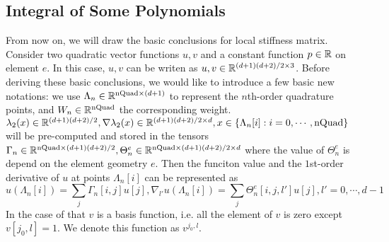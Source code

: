 \subsection{Integral of Some Polynomials}
From now on, we will draw the basic conclusions for local stiffness matrix. 
Consider two quadratic vector functions $u,v$ and a constant function $p\in\mathbb{R}$ on element $e$.
In this case, $u,v$ can be writen as $u,v\in\mathbb{R}^{(d+1)(d+2)/2\times3}$.
Before deriving these basic conclusions, we would like to introduce a few basic new notations:
we use $\Lambda_n\in\mathbb{R}^{\text{nQuad}\times (d+1)}$ to represent the $n$th-order quadrature points, 
and $W_n\in\mathbb{R}^{\text{nQuad}}$ the corresponding weight.
$\lambda_2(x)\in\mathbb{R}^{(d+1)(d+2)/2},
\nabla \lambda_2(x)\in\mathbb{R}^{(d+1)(d+2)/2\times d},
x\in\{\Lambda_n[i]:i=0,\cdots,\text{nQuad}\}$ 
will be pre-computed and stored in the tensors 
$\Gamma_n\in\mathbb{R}^{\text{nQuad}\times(d+1)(d+2)/2},
\Theta_n^e\in\mathbb{R}^{\text{nQuad}\times(d+1)(d+2)/2\times d}$
where the value of $\Theta^e_n$ is depend on the element geometry $e$.
Then the funciton value and the $1$st-order derivative of $u$ at points $\Lambda_n[i]$ can be represented as
\[u(\Lambda_n[i])=\sum_j \Gamma_n[i,j]u[j],
\nabla_{l'} u(\Lambda_n[i])=\sum_j \Theta_n^e[i,j,l']u[j],l'=0,\cdots,d-1\]
In the case of that $v$ is a basis function, i.e. all the element of 
$v$ is zero except $v[j_0,l]=1$.
We denote this function as $v^{j_0,l}$.
